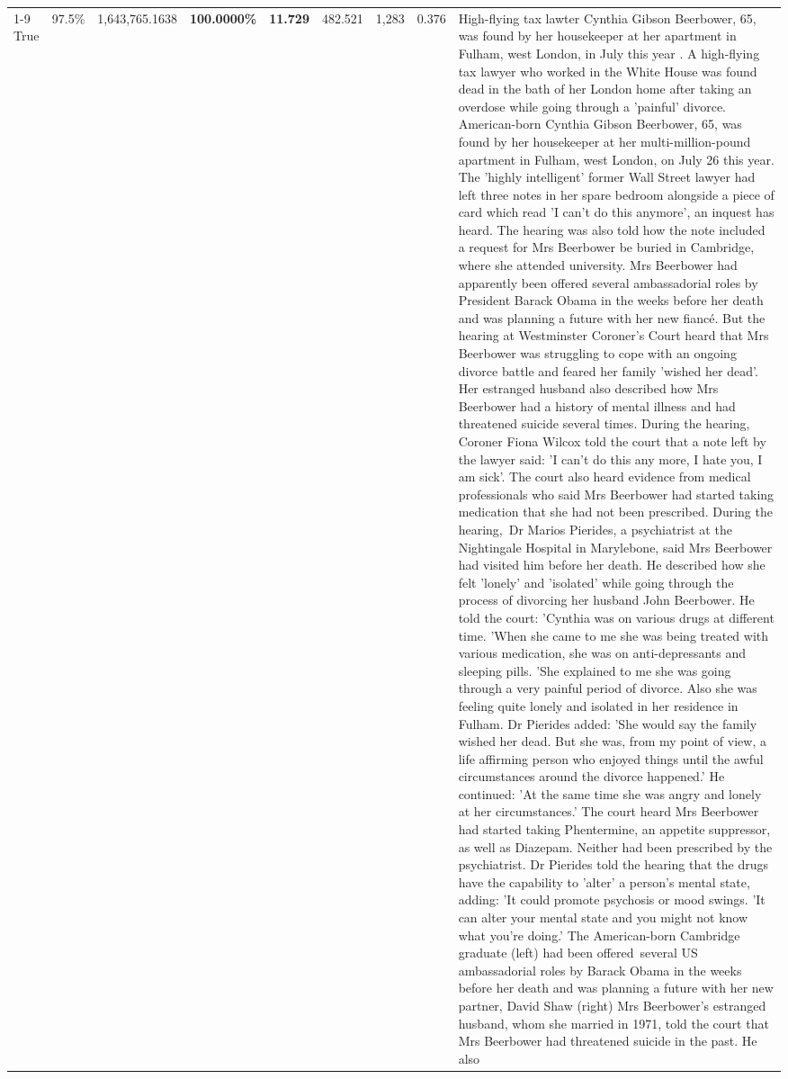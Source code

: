\begin{table}[H]
\begin{tabular}{lllrlllll}
\cline{1-9}
True & 97.5\% & 1,643,765.1638 & \bfseries \color{red} 100.0000\% & \bfseries \color{red} 11.729 & 482.521 & 1,283 & 0.376 & High-flying tax lawter Cynthia Gibson Beerbower, 65, was found by her housekeeper at her apartment in Fulham, west London, in July this year . A high-flying tax lawyer who worked in the White House was found dead in the bath of her London home after taking an overdose while going through a 'painful' divorce. American-born Cynthia Gibson Beerbower, 65, was found by her housekeeper at her multi-million-pound apartment in Fulham, west London, on July 26 this year. The 'highly intelligent' former Wall Street lawyer had left three notes in her spare bedroom alongside a piece of card which read 'I can't do this anymore', an inquest has heard. The hearing was also told how the note included a request for Mrs Beerbower be buried in Cambridge, where she attended university. Mrs Beerbower had apparently been offered several ambassadorial roles by President Barack Obama in the weeks before her death and was planning a future with her new fiancé. But the hearing at Westminster Coroner's Court heard that Mrs Beerbower was struggling to cope with an ongoing divorce battle and feared her family 'wished her dead'. Her estranged husband also described how Mrs Beerbower had a history of mental illness and had threatened suicide several times. During the hearing, Coroner Fiona Wilcox told the court that a note left by the lawyer said: 'I can't do this any more, I hate you, I am sick'. The court also heard evidence from medical professionals who said Mrs Beerbower had started taking medication that she had not been prescribed. During the hearing, Dr Marios Pierides, a psychiatrist at the Nightingale Hospital in Marylebone, said Mrs Beerbower had visited him before her death. He described how she felt 'lonely' and 'isolated' while going through the process of divorcing her husband John Beerbower. He told the court: 'Cynthia was on various drugs at different time. 'When she came to me she was being treated with various medication, she was on anti-depressants and sleeping pills. 'She explained to me she was going through a very painful period of divorce. Also she was feeling quite lonely and isolated in her residence in Fulham. Dr Pierides added: 'She would say the family wished her dead. But she was, from my point of view, a life affirming person who enjoyed things until the awful circumstances around the divorce happened.' He continued: 'At the same time she was angry and lonely at her circumstances.' The court heard Mrs Beerbower had started taking Phentermine, an appetite suppressor, as well as Diazepam. Neither had been prescribed by the psychiatrist. Dr Pierides told the hearing that the drugs have the capability to 'alter' a person's mental state, adding: 'It could promote psychosis or mood swings. 'It can alter your mental state and you might not know what you're doing.' The American-born Cambridge graduate (left) had been offered several US ambassadorial roles by Barack Obama in the weeks before her death and was planning a future with her new partner, David Shaw (right) Mrs Beerbower's estranged husband, whom she married in 1971, told the court that Mrs Beerbower had threatened suicide in the past. He also 
\end{tabular}
\end{table}
